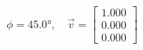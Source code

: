\documentclass[preview]{standalone}
\begin{document}
\begin{align*}
\phi = 45.0\text{°}, \quad \vec{v} = \begin{bmatrix} 1.000 \\ 0.000 \\ 0.000 \end{bmatrix}
\end{align*}
\end{document}
